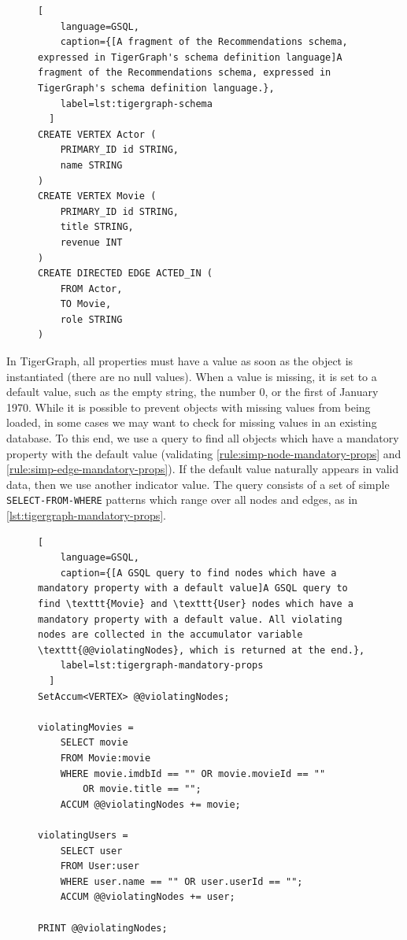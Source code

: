 \documentclass{report}
\theoremstyle{definition}
\begin{document}
\begin{figure}[H]
  \begin{lstlisting}[
    language=GSQL,
    caption={[A fragment of the Recommendations schema, expressed in TigerGraph's schema definition language]A fragment of the Recommendations schema, expressed in TigerGraph's schema definition language.},
    label=lst:tigergraph-schema
  ]
CREATE VERTEX Actor (
    PRIMARY_ID id STRING,
    name STRING
)
CREATE VERTEX Movie (
    PRIMARY_ID id STRING,
    title STRING,
    revenue INT
)
CREATE DIRECTED EDGE ACTED_IN (
    FROM Actor,
    TO Movie,
    role STRING
)
  \end{lstlisting}
\end{figure}

In TigerGraph, all properties must have a value as soon as the object is instantiated (there are no null values). When a value is missing, it is set to a default value, such as the empty string, the number 0, or the first of January 1970. While it is possible to prevent objects with missing values from being loaded, in some cases we may want to check for missing values in an existing database. To this end, we use a query to find all objects which have a mandatory property with the default value (validating \autoref{rule:simp-node-mandatory-props} and \ref{rule:simp-edge-mandatory-props}). If the default value naturally appears in valid data, then we use another indicator value. The query consists of a set of simple \texttt{SELECT-FROM-WHERE} patterns which range over all nodes and edges, as in \autoref{lst:tigergraph-mandatory-props}.

\begin{figure}[H]
  \begin{lstlisting}[
    language=GSQL,
    caption={[A GSQL query to find nodes which have a mandatory property with a default value]A GSQL query to find \texttt{Movie} and \texttt{User} nodes which have a mandatory property with a default value. All violating nodes are collected in the accumulator variable \texttt{@@violatingNodes}, which is returned at the end.},
    label=lst:tigergraph-mandatory-props
  ]
SetAccum<VERTEX> @@violatingNodes;

violatingMovies =
    SELECT movie
    FROM Movie:movie
    WHERE movie.imdbId == "" OR movie.movieId == ""
        OR movie.title == "";
    ACCUM @@violatingNodes += movie;

violatingUsers =
    SELECT user
    FROM User:user
    WHERE user.name == "" OR user.userId == "";
    ACCUM @@violatingNodes += user;

PRINT @@violatingNodes;
  \end{lstlisting}
\end{figure}
\end{document}
